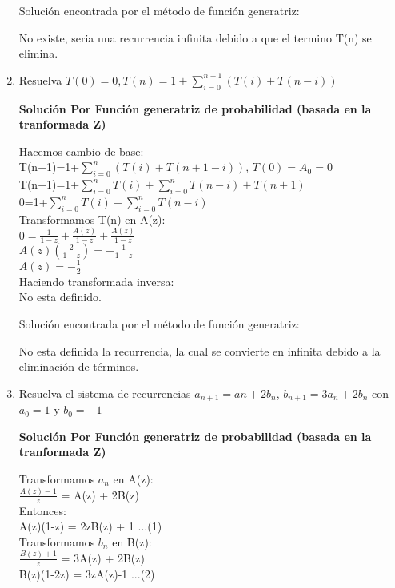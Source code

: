 \documentclass{article}
\begin{document}
\begin{enumerate}[label=\textbf{\alph*.}]
  Soluci\'on encontrada por el m\'etodo de función generatriz:
  \begin{center}
    No existe, seria una recurrencia infinita debido a que el termino T(n) se elimina.
  \end{center}

  \item Resuelva $T(0)=0, T(n)=1+\sum^{n-1}_{i=0}(T(i)+T(n-i))$
  
  \textbf{Soluci\'on Por Funci\'on generatriz de probabilidad (basada en la tranformada Z)}
  
  Hacemos cambio de base:\\
  T(n+1)=1+$\sum_{i=0}^{n} (T(i)+T(n+1-i))$, $T(0) = A_0 = 0$\\
  T(n+1)=1+$\sum_{i=0}^{n} T(i) + \sum_{i=0}^{n}T(n-i) + T(n+1)$\\
  0=1+$\sum_{i=0}^{n} T(i) + \sum_{i=0}^{n}T(n-i)$\\
  Transformamos T(n) en A(z):\\
  $0 = \frac{1}{1-z} + \frac{A(z)}{1-z} + \frac{A(z)}{1-z}$\\
  $A(z)(\frac{2}{1-z})=-\frac{1}{1-z}$\\
  $A(z) = -\frac{1}{2}$\\
  Haciendo transformada inversa:\\
  No esta definido.

  Soluci\'on encontrada por el m\'etodo de función generatriz:
  \begin{center}
    No esta definida la recurrencia, la cual se convierte en infinita debido a la eliminación de términos.
  \end{center}


\item Resuelva el sistema de recurrencias   $a_{n+1}=an+2b_{n}$, $b_{n+1}=3a_n+2b_n$ con $a_0=1$ y $b_0=-1$
  
  \textbf{Soluci\'on Por Funci\'on generatriz de probabilidad (basada en la tranformada Z)}
  
  Transformamos $a_n$ en A(z):\\
  $\frac{A(z)-1}{z}$ = A(z) + 2B(z)\\
  Entonces:\\
  A(z)(1-z) = 2zB(z) + 1 ...(1)\\
  
  Transformamos $b_n$ en B(z):\\
  $\frac{B(z)+1}{z}$ = 3A(z) + 2B(z)\\
  B(z)(1-2z) = 3zA(z)-1 ...(2)\\
  

\end{enumerate}
\end{document}
